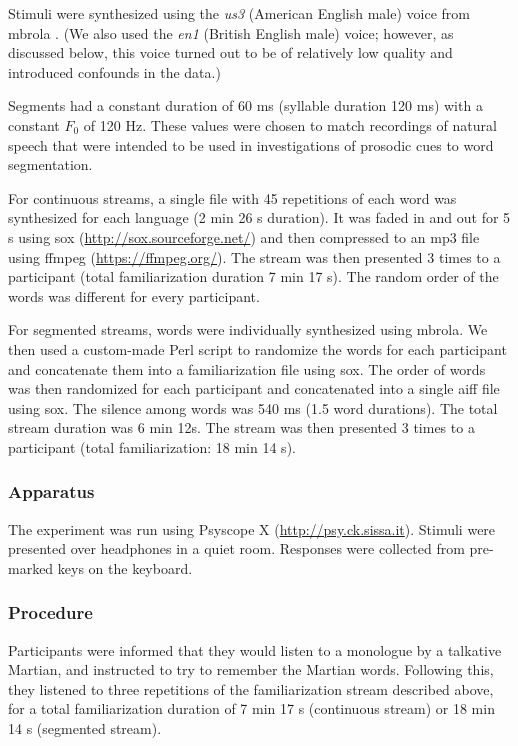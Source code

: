 \documentclass[]{article}
\begin{document}
Stimuli were synthesized using the \emph{us3} (American English male) voice from mbrola \citep{mbrola}. (We also used the \emph{en1} (British English male) voice; however, as discussed below, this voice turned out to be of relatively low quality and introduced confounds in the data.)

Segments had a constant duration of 60 ms (syllable duration 120 ms) with a constant \(F_0\) of 120 Hz. These values were chosen to match recordings of natural speech that were intended to be used in investigations of prosodic cues to word segmentation.

For continuous streams, a single file with 45 repetitions of each word was synthesized for each language (2 min 26 s duration). It was faded in and out for 5 s using sox (\url{http://sox.sourceforge.net/}) and then compressed to an mp3 file using ffmpeg (\url{https://ffmpeg.org/}). The stream was then presented 3 times to a participant (total familiarization duration 7 min 17 s). The random order of the words was different for every participant.

For segmented streams, words were individually synthesized using mbrola. We then used a custom-made Perl script to randomize the words for each participant and concatenate them into a familiarization file using sox. The order of words was then randomized for each participant and concatenated into a single aiff file using sox. The silence among words was 540 ms (1.5 word durations). The total stream duration was 6 min 12s. The stream was then presented 3 times to a participant (total familiarization: 18 min 14 s).

\subsubsection{Apparatus}\label{apparatus}

The experiment was run using Psyscope X (\url{http://psy.ck.sissa.it}). Stimuli were presented over headphones in a quiet room. Responses were collected from pre-marked keys on the keyboard.

\subsubsection{Procedure}\label{procedure}

Participants were informed that they would listen to a monologue by a talkative Martian, and instructed to try to remember the Martian words. Following this, they listened to three repetitions of the familiarization stream described above, for a total familiarization duration of 7 min 17 s (continuous stream) or 18 min 14 s (segmented stream).
\end{document}
